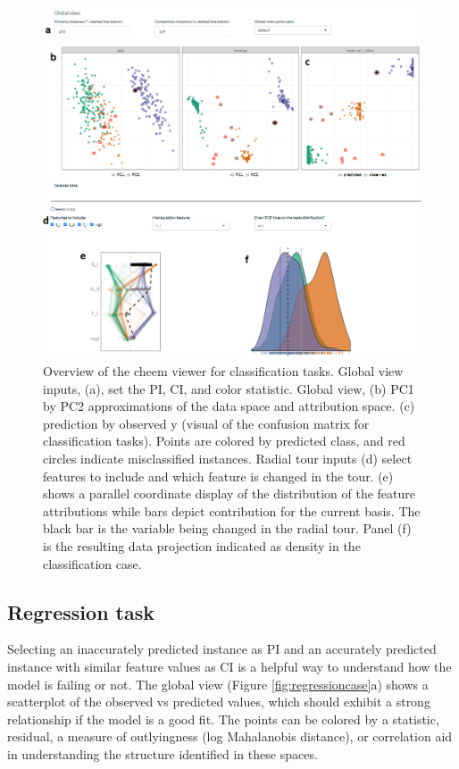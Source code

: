 \documentclass[
]{article}
\begin{document}
\begin{figure}

{\centering \includegraphics[width=1\linewidth]{./figures/app_classification} 

}

\caption{Overview of the cheem viewer for classification tasks. Global view inputs, (a), set the PI, CI, and color statistic. Global view, (b) PC1 by PC2 approximations of the data space and attribution space. (c) prediction by observed y (visual of the confusion matrix for classification tasks). Points are colored by predicted class, and red circles indicate misclassified instances. Radial tour inputs (d) select features to include and which feature is changed in the tour. (e) shows a parallel coordinate display of the distribution of the feature attributions while bars depict contribution for the current basis. The black bar is the variable being changed in the radial tour. Panel (f) is the resulting data projection indicated as density in the classification case.}\label{fig:classificationcase}
\end{figure}

\hypertarget{regression-task}{%
\subsection{Regression task}\label{regression-task}}

Selecting an inaccurately predicted instance as PI and an accurately predicted instance with similar feature values as CI is a helpful way to understand how the model is failing or not. The global view (Figure \ref{fig:regressioncase}a) shows a scatterplot of the observed vs predicted values, which should exhibit a strong relationship if the model is a good fit. The points can be colored by a statistic, residual, a measure of outlyingness (log Mahalanobis distance), or correlation aid in understanding the structure identified in these spaces.
\end{document}
